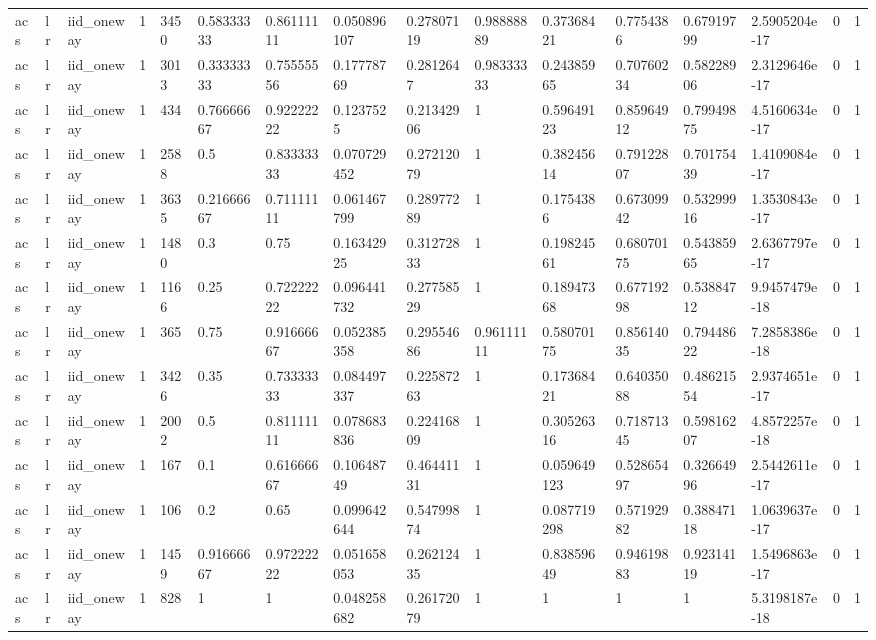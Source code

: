 \begin{tabular}{llllllllllllllll}
acs & lr & iid\_oneway & 1 & 3450 & 0.58333333 & 0.86111111 & 0.050896107 & 0.27807119 & 0.98888889 & 0.37368421 & 0.7754386 & 0.67919799 & 2.5905204e-17 & 0 & 1 \\
acs & lr & iid\_oneway & 1 & 3013 & 0.33333333 & 0.75555556 & 0.17778769 & 0.2812647 & 0.98333333 & 0.24385965 & 0.70760234 & 0.58228906 & 2.3129646e-17 & 0 & 1 \\
acs & lr & iid\_oneway & 1 & 434 & 0.76666667 & 0.92222222 & 0.1237525 & 0.21342906 & 1 & 0.59649123 & 0.85964912 & 0.79949875 & 4.5160634e-17 & 0 & 1 \\
acs & lr & iid\_oneway & 1 & 2588 & 0.5 & 0.83333333 & 0.070729452 & 0.27212079 & 1 & 0.38245614 & 0.79122807 & 0.70175439 & 1.4109084e-17 & 0 & 1 \\
acs & lr & iid\_oneway & 1 & 3635 & 0.21666667 & 0.71111111 & 0.061467799 & 0.28977289 & 1 & 0.1754386 & 0.67309942 & 0.53299916 & 1.3530843e-17 & 0 & 1 \\
acs & lr & iid\_oneway & 1 & 1480 & 0.3 & 0.75 & 0.16342925 & 0.31272833 & 1 & 0.19824561 & 0.68070175 & 0.54385965 & 2.6367797e-17 & 0 & 1 \\
acs & lr & iid\_oneway & 1 & 1166 & 0.25 & 0.72222222 & 0.096441732 & 0.27758529 & 1 & 0.18947368 & 0.67719298 & 0.53884712 & 9.9457479e-18 & 0 & 1 \\
acs & lr & iid\_oneway & 1 & 365 & 0.75 & 0.91666667 & 0.052385358 & 0.29554686 & 0.96111111 & 0.58070175 & 0.85614035 & 0.79448622 & 7.2858386e-18 & 0 & 1 \\
acs & lr & iid\_oneway & 1 & 3426 & 0.35 & 0.73333333 & 0.084497337 & 0.22587263 & 1 & 0.17368421 & 0.64035088 & 0.48621554 & 2.9374651e-17 & 0 & 1 \\
acs & lr & iid\_oneway & 1 & 2002 & 0.5 & 0.81111111 & 0.078683836 & 0.22416809 & 1 & 0.30526316 & 0.71871345 & 0.59816207 & 4.8572257e-18 & 0 & 1 \\
acs & lr & iid\_oneway & 1 & 167 & 0.1 & 0.61666667 & 0.10648749 & 0.46441131 & 1 & 0.059649123 & 0.52865497 & 0.32664996 & 2.5442611e-17 & 0 & 1 \\
acs & lr & iid\_oneway & 1 & 106 & 0.2 & 0.65 & 0.099642644 & 0.54799874 & 1 & 0.087719298 & 0.57192982 & 0.38847118 & 1.0639637e-17 & 0 & 1 \\
acs & lr & iid\_oneway & 1 & 1459 & 0.91666667 & 0.97222222 & 0.051658053 & 0.26212435 & 1 & 0.83859649 & 0.94619883 & 0.92314119 & 1.5496863e-17 & 0 & 1 \\
acs & lr & iid\_oneway & 1 & 828 & 1 & 1 & 0.048258682 & 0.26172079 & 1 & 1 & 1 & 1 & 5.3198187e-18 & 0 & 1 \\

\end{tabular}

